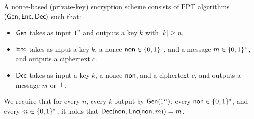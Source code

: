 \newline

\begin{definition} \label{def:nonce}
  A nonce-based (private-key) encryption scheme consists of PPT algorithms
  $(\textsf{Gen}, \textsf{Enc}, \textsf{Dec})$ such that:
  \begin{itemize}
    \item $\textsf{Gen}$ takes as input $1^n$ and outputs a key $k$ with $|k| \ge n$.
    \item $\textsf{Enc}$ takes as input a key $k$, a nonce $\textsf{non} \in \{0, 1\}^{*}$, and
          a message $m \in \{0, 1\}^{*}$, and outputs a ciphertext $c$.
    \item $\textsf{Dec}$ takes as input a key $k$, a nonce $\textsf{non}$, and
          a ciphertext $c$, and outputs a message $m$ or $\perp$.
  \end{itemize}
  We require that for every $n$, every $k$ output by $\textsf{Gen}(1^n)$, every
  $\textsf{non} \in \{0, 1\}^{*}$, and every $m \in \{0, 1\}^{*}$, it holds that
  $\textsf{Dec}(\textsf{non}, \textsf{Enc}(\textsf{non}, m)) = m$.
\end{definition}



\newline

